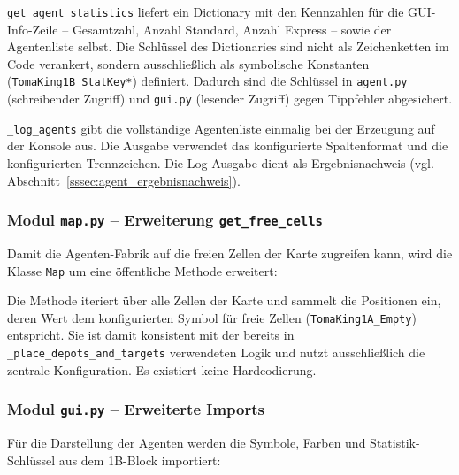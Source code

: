 \texttt{get\_agent\_statistics} liefert ein Dictionary mit den Kennzahlen für die \acs{GUI}-Info-Zeile -- Gesamtzahl, Anzahl Standard, Anzahl Express -- sowie der Agentenliste selbst. Die Schlüssel des Dictionaries sind nicht als Zeichenketten im Code verankert, sondern ausschließlich als symbolische Konstanten (\texttt{TomaKing1B\_StatKey*}) definiert. Dadurch sind die Schlüssel in \texttt{agent.py} (schreibender Zugriff) und \texttt{gui.py} (lesender Zugriff) gegen Tippfehler abgesichert.

\texttt{\_log\_agents} gibt die vollständige Agentenliste einmalig bei der Erzeugung auf der Konsole aus. Die Ausgabe verwendet das konfigurierte Spaltenformat und die konfigurierten Trennzeichen. Die Log-Ausgabe dient als Ergebnisnachweis (vgl. Abschnitt~\ref{sssec:agent_ergebnisnachweis}).


\subsubsection{Modul \texttt{map.py} – Erweiterung \texttt{get\_free\_cells}}
\label{sssec:map_get_free_cells}

Damit die Agenten-Fabrik auf die freien Zellen der Karte zugreifen kann, wird die Klasse \texttt{Map} um eine öffentliche Methode erweitert:



Die Methode iteriert über alle Zellen der Karte und sammelt die Positionen ein, deren Wert dem konfigurierten Symbol für freie Zellen (\texttt{TomaKing1A\_Empty}) entspricht. Sie ist damit konsistent mit der bereits in \texttt{\_place\_depots\_and\_targets} verwendeten Logik und nutzt ausschließlich die zentrale Konfiguration. Es existiert keine Hardcodierung.


\subsubsection{Modul \texttt{gui.py} – Erweiterte Imports}

Für die Darstellung der Agenten werden die Symbole, Farben und Statistik-Schlüssel aus dem 1B-Block importiert:

